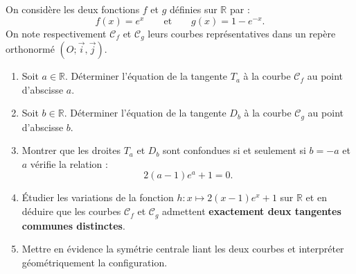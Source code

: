 \documentclass[11pt,a4paper]{article}
\newcommand{\R}{\mathbb{R}}
\begin{document}
On considère les deux fonctions $f$ et $g$ définies sur $\R$ par :
\[
f(x) = e^x \qquad \text{et} \qquad g(x) = 1 - e^{-x}.
\]
On note respectivement $\mathcal{C}_f$ et $\mathcal{C}_g$ leurs courbes représentatives dans un repère orthonormé $(O; \vec{i}, \vec{j})$.
\begin{enumerate}[label=\textbf{\arabic*.}]
    \item Soit $a \in \R$. Déterminer l'équation de la tangente $T_a$ à la courbe $\mathcal{C}_f$ au point d'abscisse $a$.
    \item Soit $b \in \R$. Déterminer l'équation de la tangente $D_b$ à la courbe $\mathcal{C}_g$ au point d'abscisse $b$.
    \item Montrer que les droites $T_a$ et $D_b$ sont confondues si et seulement si $b = -a$ et $a$ vérifie la relation :
    \[
    2(a-1)e^a + 1 = 0.
    \]
    \item Étudier les variations de la fonction $h : x \mapsto 2(x-1)e^x + 1$ sur $\R$ et en déduire que les courbes $\mathcal{C}_f$ et $\mathcal{C}_g$ admettent \textbf{exactement deux tangentes communes distinctes}.
    \item Mettre en évidence la symétrie centrale liant les deux courbes et interpréter géométriquement la configuration.
\end{enumerate}
\end{document}

